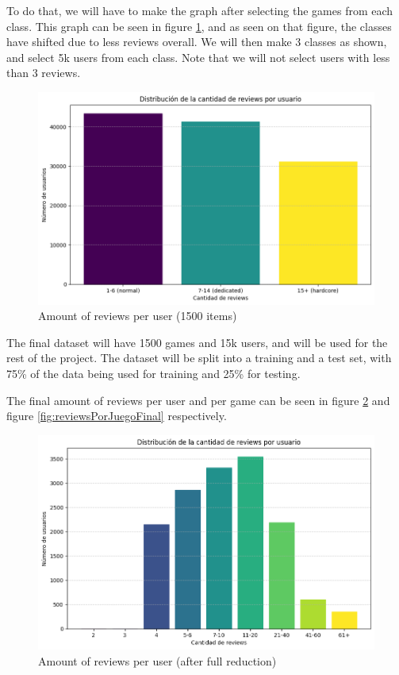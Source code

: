 \documentclass{article}
\begin{document}
To do that, we will have to make the graph after selecting the games from each class. This graph can be seen in figure \ref{fig:reviewsPorUsuario2}, and as seen on that figure, the classes have shifted due to less reviews overall. We will then make 3 classes as shown, and select 5k users from each class. Note that we will not select users with less than 3 reviews.

\begin{figure}[h]
    \centering
    \includegraphics[width=0.9\linewidth]{reviewsPorUsuario2.png}
    \caption{Amount of reviews per user (1500 items)}
    \label{fig:reviewsPorUsuario2}
\end{figure}

The final dataset will have 1500 games and 15k users, and will be used for the rest of the project. The dataset will be split into a training and a test set, with 75\% of the data being used for training and 25\% for testing.

The final amount of reviews per user and per game can be seen in figure \ref{fig:reviewsPorUsuarioFinal} and figure \ref{fig:reviewsPorJuegoFinal} respectively.

\begin{figure}[h]
    \centering
    \includegraphics[width=0.9\linewidth]{reviewsPorUsuarioFinal.png}
    \caption{Amount of reviews per user (after full reduction)}
    \label{fig:reviewsPorUsuarioFinal}
\end{figure}
\end{document}
